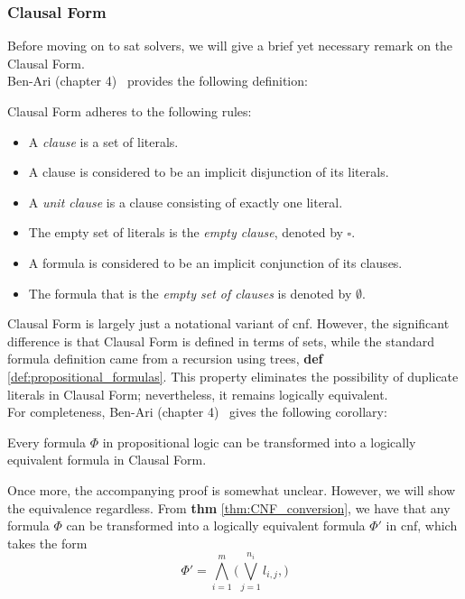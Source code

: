 \subsubsection{Clausal Form}
Before moving on to \acrshort{sat} solvers, we will give a brief yet necessary remark on the Clausal Form.
\\
Ben-Ari (chapter 4)~\cite{Math-Logic-for-CompSci} provides the following definition:
\begin{definition}
    Clausal Form adheres to the following rules:
    \begin{itemize}
        \item A \emph{clause} is a set of literals.
        \item A clause is considered to be an implicit disjunction of its literals.
        \item A \emph{unit clause} is a clause consisting of exactly one literal.
        \item The empty set of literals is the \emph{empty clause}, denoted by \(\square\).
        \item A formula is considered to be an implicit conjunction of its clauses.
        \item The formula that is the \emph{empty set of clauses} is denoted by \(\emptyset\).
    \end{itemize}
\end{definition}
Clausal Form is largely just a notational variant of \acrshort{cnf}. However, the significant difference is that Clausal Form is defined in terms of sets, while the standard formula definition came from a recursion using trees, \textbf{def} \ref{def:propositional_formulas}. This property eliminates the possibility of duplicate literals in Clausal Form; nevertheless, it remains logically equivalent.
\\
For completeness, Ben-Ari (chapter 4)~\cite{Math-Logic-for-CompSci} gives the following corollary:
\begin{corollary}
    Every formula \(\Phi\) in propositional logic can be transformed into a logically equivalent formula in Clausal Form.
\end{corollary}
Once more, the accompanying proof is somewhat unclear. However, we will show the equivalence regardless. From \textbf{thm} \ref{thm:CNF_conversion}, we have that any formula \(\Phi\) can be transformed into a logically equivalent formula \(\Phi'\) in \acrshort{cnf}, which takes the form
\begin{equation*}
    \Phi' = \bigwedge_{i=1}^m \bigg(
        \bigvee_{j=1}^{n_i} l_{i,j},
    \bigg)
\end{equation*}
